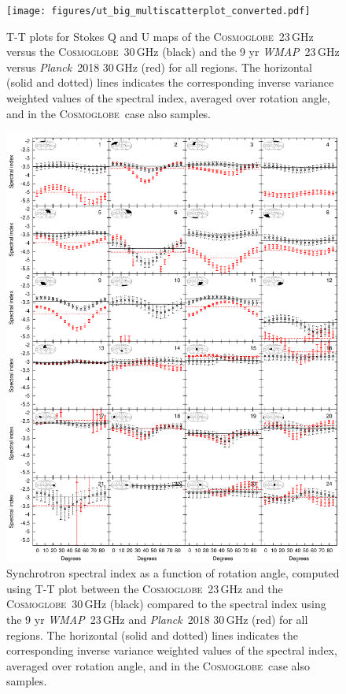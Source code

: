 \documentclass[twocolumn]{../../common/aa}
\def\WMAP{\emph{WMAP}}
\def\Planck{\emph{Planck}}
\newcommand{\Cosmoglobe}{\textsc{Cosmoglobe}}
\begin{document}
\begin{figure}
        \centering
        \texttt{[image: figures/ut\_big\_multiscatterplot\_converted.pdf]}
        \caption{T-T plots for Stokes Q and U maps of the \Cosmoglobe\ 23\,GHz versus the \Cosmoglobe\ 30\,GHz (black) and the 9 yr \WMAP\ 23\,GHz versus \Planck\ 2018 30\,GHz (red) for all regions. The horizontal (solid and dotted) lines indicates the corresponding inverse variance weighted values of the spectral index, averaged over rotation angle, and in the \Cosmoglobe\ case also samples.}
        \label{fig:cos30_beta_bigscatter}
\end{figure}

\begin{figure}
        \centering
        \includegraphics[width=\linewidth]{figures/cos30_ut_big_multialphaplot_converted.pdf}
        \caption{Synchrotron spectral index as a function of rotation angle, computed using T-T plot between the \Cosmoglobe\ 23\,GHz and the \Cosmoglobe\ 30\,GHz (black) compared to the spectral index using the 9 yr \WMAP\ 23\,GHz and \Planck\ 2018 30\,GHz (red) for all regions. The horizontal (solid and dotted) lines indicates the corresponding inverse variance weighted values of the spectral index, averaged over rotation angle, and in the \Cosmoglobe\ case also samples.}
        \label{fig:cos30_beta_bigalpha}
\end{figure}
\end{document}
